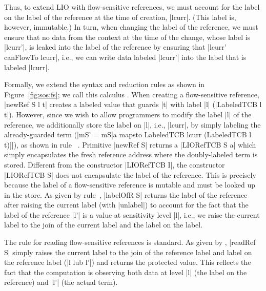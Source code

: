 Thus, to extend LIO with flow-sensitive references, we must account for the label
on the label of the reference at the time of creation, |lcurr|.
%
(This label is, however, immutable.)
%
In turn, when changing the label of the reference, we must ensure that no data
from the context at the time of the change, whose label is |lcurr'|, is leaked
into the label of the reference by ensuring that |lcurr' canFlowTo lcurr|,
i.e., we can write data labeled |lcurr'| into the label that is labeled |lcurr|.
 
Formally, we extend the \lio{} syntax and reduction rules as shown in
Figure~\ref{fig:sos:fs}; we call this calculus \liofs{}.
%
When creating a flow-sensitive reference, |newRef S l t| creates a labeled
value that guards |t| with label |l| (|LabeledTCB l t|).
%
However, since we wish to allow programmers to modify the label |l| of the
reference, we additionally store the label on |l|, i.e., |lcurr|, by simply
labeling the already-guarded term (|mS' = mS[a mapsto LabeledTCB lcurr
(LabeledTCB l t)]|), as shown in rule~ .
%
Primitive |newRef S| returns a |LIORefTCB S a| which simply encapsulates the fresh
reference address where the doubly-labeled term is stored.
%
Different from the constructor |LIORefTCB I|,  the constructor |LIORefTCB S|
does not encapsulate the label of the reference. 
%
This is precisely because the label of a flow-sensitive reference is 
mutable and must be looked up in the store.
%
As given by rule~, |labelOfR S| returns the label of the
reference after raising the current label (with |unlabel|) to account for the
fact that the label of the reference |l'| is a value at sensitivity level |l|,
i.e., we raise the current label to the join of the current label and the label
on the label.

The rule for reading flow-sensitive references is standard.
%
As given by , |readRef S| simply raises the
current label to the join of the reference label and label on the
reference label (|l lub l'|) and returns the protected value.
%
This reflects the fact that the computation is observing both data at
level |l| (the label on the reference) and |l'| (the actual term).


